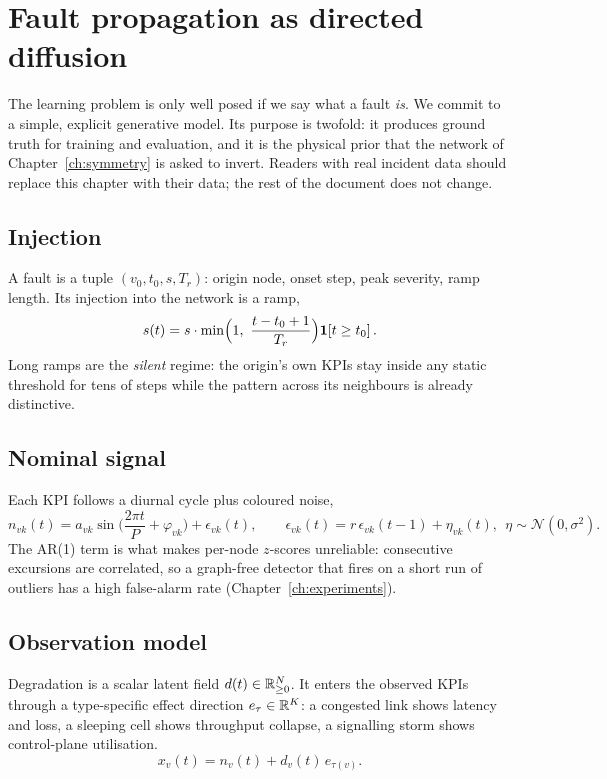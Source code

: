 \chapter{Fault propagation as directed diffusion}
\label{ch:propagation}

The learning problem is only well posed if we say what a fault \emph{is}. We commit to a simple,
explicit generative model. Its purpose is twofold: it produces ground truth for training and
evaluation, and it is the physical prior that the network of Chapter~\ref{ch:symmetry} is asked to
invert. Readers with real incident data should replace this chapter with their data; the rest of
the document does not change.

\section{Injection}
A fault is a tuple $(v_0,t_0,s,T_r)$: origin node, onset step, peak severity, ramp length. Its
injection into the network is a ramp,
\begin{equation}
s(t)=s\cdot\min\!\Big(1,\ \frac{t-t_0+1}{T_r}\Big)\ind{t\ge t_0}.
\label{eq:injection}
\end{equation}
Long ramps are the \emph{silent} regime: the origin's own KPIs stay inside any static threshold for
tens of steps while the pattern across its neighbours is already distinctive.

\section{Nominal signal}
Each KPI follows a diurnal cycle plus coloured noise,
\begin{equation}
n_{vk}(t)=a_{vk}\sin\!\Big(\frac{2\pi t}{P}+\varphi_{vk}\Big)+\epsilon_{vk}(t),\qquad
\epsilon_{vk}(t)=r\,\epsilon_{vk}(t-1)+\eta_{vk}(t),\ \ \eta\sim\mathcal N(0,\sigma^2).
\label{eq:nominal}
\end{equation}
The AR(1) term is what makes per-node $z$-scores unreliable: consecutive excursions are correlated,
so a graph-free detector that fires on a short run of outliers has a high false-alarm rate
(Chapter~\ref{ch:experiments}).

\section{Observation model}
Degradation is a scalar latent field $d(t)\in\mathbb{R}^N_{\ge0}$. It enters the observed KPIs through a
type-specific effect direction $e_{\tau}\in\mathbb{R}^K$: a congested link shows latency and loss, a
sleeping cell shows throughput collapse, a signalling storm shows control-plane utilisation.
\begin{equation}
x_v(t)=n_v(t)+d_v(t)\,e_{\tau(v)}.
\label{eq:observation}
\end{equation}

